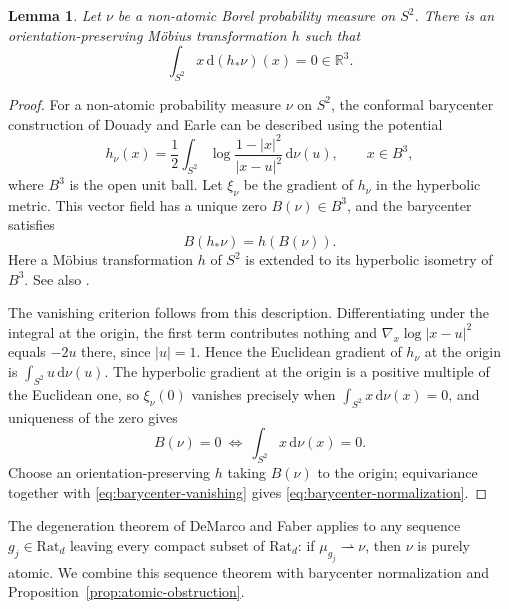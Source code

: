\documentclass[10pt,a4paper]{amsart}
\newtheorem{lemma}[theorem]{Lemma}
\newcommand{\R}{\mathbb R}
\newcommand{\dd}{\mathrm d}
\numberwithin{equation}{section}
\begin{document}
\begin{lemma}\label{lem:barycenter-normalization}
Let $\nu$ be a non-atomic Borel probability measure on $S^2$. There is an orientation-preserving M\"obius transformation $h$ such that
\begin{equation}\label{eq:barycenter-normalization}
 \int_{S^2}x\,\dd(h_*\nu)(x)=0\in\R^3.
\end{equation}
\end{lemma}

\begin{proof}
For a non-atomic probability measure $\nu$ on $S^2$, the conformal barycenter construction of Douady and Earle \cite[Section 11]{DE86} can be described using the potential
\[
 h_\nu(x)=\frac12\int_{S^2}\log\frac{1-|x|^2}{|x-u|^2}\,\dd\nu(u),
 \qquad x\in B^3,
\]
where $B^3$ is the open unit ball. Let $\xi_\nu$ be the gradient of $h_\nu$ in the hyperbolic metric. This vector field has a unique zero $B(\nu)\in B^3$, and the barycenter satisfies
\[
 B(h_*\nu)=h(B(\nu)).
\]
Here a M\"obius transformation $h$ of $S^2$ is extended to its hyperbolic isometry of $B^3$. See also \cite[Section 2]{Pet11}.

The vanishing criterion follows from this description. Differentiating under the integral at the origin, the first term contributes nothing and $\nabla_x\log|x-u|^2$ equals $-2u$ there, since $|u|=1$. Hence the Euclidean gradient of $h_\nu$ at the origin is $\int_{S^2}u\,\dd\nu(u)$. The hyperbolic gradient at the origin is a positive multiple of the Euclidean one, so $\xi_\nu(0)$ vanishes precisely when $\int_{S^2}x\,\dd\nu(x)=0$, and uniqueness of the zero gives
\begin{equation}\label{eq:barycenter-vanishing}
 B(\nu)=0\ \Longleftrightarrow\ \int_{S^2}x\,\dd\nu(x)=0.
\end{equation}
Choose an orientation-preserving $h$ taking $B(\nu)$ to the origin; equivariance together with \eqref{eq:barycenter-vanishing} gives \eqref{eq:barycenter-normalization}.
\end{proof}

The degeneration theorem of DeMarco and Faber \cite[Theorem A]{DF14} applies to any sequence $g_j\in\mathrm{Rat}_d$ leaving every compact subset of $\mathrm{Rat}_d$: if $\mu_{g_j}\rightharpoonup\nu$, then $\nu$ is purely atomic. We combine this sequence theorem with barycenter normalization and Proposition~\ref{prop:atomic-obstruction}.
\end{document}
